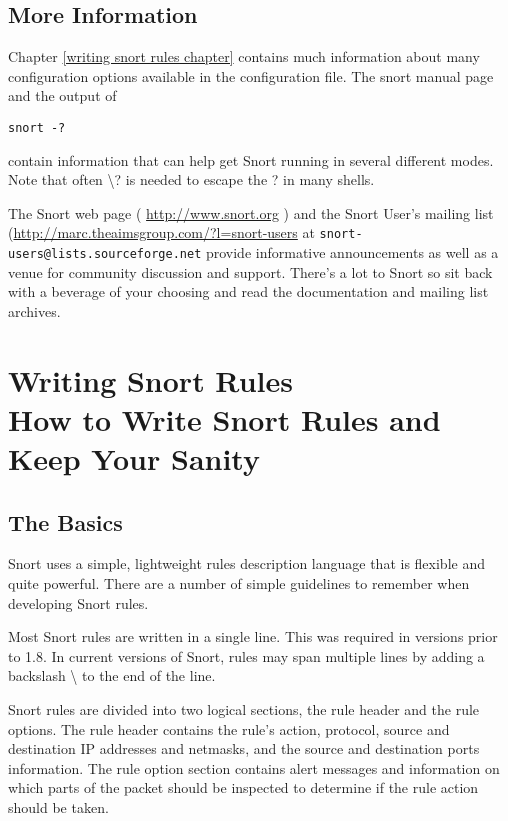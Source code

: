 \documentclass[english]{report}
\begin{document}
\section{More Information}

Chapter \ref{writing snort rules chapter} contains much information
about many configuration options available in the configuration file.
The snort manual page and the output of 

\begin{verbatim}
snort -? 
\end{verbatim}
contain information that can help get Snort running in several different
modes. Note that often \textbackslash{}? is needed to escape the ?
in many shells. 

The Snort web page ( \url{http://www.snort.org} ) and the Snort User's
mailing list (\url{http://marc.theaimsgroup.com/?l=snort-users} at 
\verb?snort-users@lists.sourceforge.net? provide informative announcements
as well as a venue for community discussion and support. There's a lot
to Snort so sit back with a beverage of your choosing and read the
documentation and mailing list archives.


\chapter{Writing Snort Rules\protect \\
How to Write Snort Rules and Keep Your Sanity\label{writing snort rules chapter}}


\section{The Basics}

Snort uses a simple, lightweight rules description language that is
flexible and quite powerful. There are a number of simple guidelines
to remember when developing Snort rules.

Most Snort rules are written in a single line. This was required in
versions prior to 1.8. In current versions of Snort, rules may span
multiple lines by adding a backslash \textbackslash{} to the end of
the line. 

Snort rules are divided into two logical sections, the rule header
and the rule options. The rule header contains the rule's action,
protocol, source and destination IP addresses and netmasks, and the
source and destination ports information. The rule option section
contains alert messages and information on which parts of the packet
should be inspected to determine if the rule action should be taken.
\end{document}
